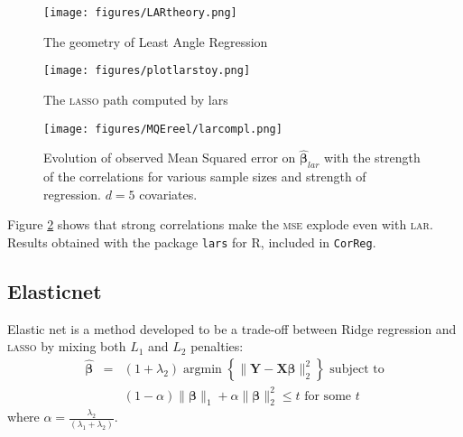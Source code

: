 \documentclass[12pt,a4paper]{report}
\begin{document}
\begin{figure}[h!]
	\centering
		  \texttt{[image: figures/LARtheory.png]}
		\caption{The geometry of Least Angle Regression}
	\end{figure}
				
\begin{figure}[h!]
	\centering
		  \texttt{[image: figures/plotlarstoy.png]}
		\caption{The \textsc{lasso} path computed by lars}\label{plotlarstoy}
	\end{figure}			
	
		 \begin{figure}
	 \centering
	  \texttt{[image: figures/MQEreel/larcompl.png]}
	  \caption{Evolution of observed Mean Squared error on $\hat{\boldsymbol{\beta}}_{lar}$ with the strength of the correlations for various sample sizes and strength of regression. $d=5$ covariates. } \label{MQElarcompl}
	\end{figure}	
	 Figure \ref{MQElarcompl} shows that strong correlations make the \textsc{mse} explode even with \textsc{lar}. Results obtained with the package {\tt lars} for R, included in {\tt CorReg}.
 	 
	 \FloatBarrier
		\subsection{Elasticnet}		%

			Elastic net \cite{zou2005regularization} is a method developed to be a trade-off between Ridge regression and \textsc{lasso} by mixing both $L_1$ and $L_2$ penalties: 
	\begin{eqnarray}
		\boldsymbol{\hat{\beta}}&=&(1+\lambda_2) \operatorname{argmin}\left\lbrace \parallel \boldsymbol{Y}-\boldsymbol{X\beta} \parallel_2^2 \right\rbrace \textrm{ subject to} \nonumber \\
			 & &(1-\alpha)\parallel\boldsymbol{\beta}\parallel_1+\alpha\parallel\boldsymbol{\beta}\parallel_2^2\leq t \textrm{ for some } t  \nonumber 
	\end{eqnarray}
	where $\alpha=\frac{\lambda_2}{(\lambda_1+\lambda_2)}$. 
	
\end{document}
